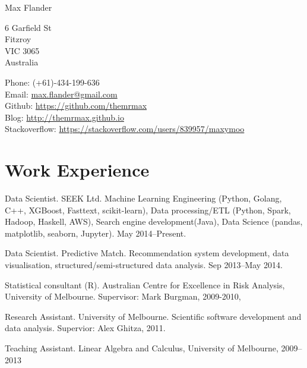 \documentclass[10pt,a4paper]{article}
\def\name{Max Flander}
\renewenvironment{itemize}{
  \begin{list}{}{
    \setlength{\leftmargin}{1.5em}
    \setlength{\itemsep}{0.25em}
    \setlength{\parskip}{0pt}
    \setlength{\parsep}{0.25em}
  }
}{
  \end{list}
}
\begin{document}
{\huge \name}


\bigskip

\begin{minipage}[t]{0.4\textwidth}
  6 Garfield St \\
  Fitzroy \\
  VIC 3065 \\
  Australia
\end{minipage}
\begin{minipage}[t]{0.5\textwidth}
  Phone: (+61)-434-199-636 \\
  Email: \href{mailto:max.flander@gmail.com}{max.flander@gmail.com} \\
  Github: \href{https://github.com/themrmax}{https://github.com/themrmax}\\
  Blog: \href{http://themrmax.github.io}{http://themrmax.github.io} \\
  Stackoverflow: \href{https://stackoverflow.com/users/839957/maxymoo}{https://stackoverflow.com/users/839957/maxymoo}
\end{minipage}
\raggedright
\section*{Work Experience}

\begin{itemize}
	\item Data Scientist. SEEK Ltd. Machine Learning Engineering (Python, Golang, C++, XGBoost, Fasttext, scikit-learn), Data processing/ETL (Python, Spark, Hadoop, Haskell, AWS), Search engine development(Java), Data Science (pandas, matplotlib, seaborn, Jupyter). May 2014--Present.
	\item Data Scientist. Predictive Match. Recommendation system development, data visualisation, structured/semi-structured data analysis. Sep 2013--May 2014.
	\item Statistical consultant (R). Australian Centre for Excellence in Risk Analysis, University of Melbourne. Supervisor: Mark Burgman, 2009-2010,
	\item Research Assistant. University of Melbourne. Scientific software development and data analysis. Supervior: Alex Ghitza, 2011.
	\item Teaching Assistant. Linear Algebra and Calculus, University of Melbourne, 2009--2013
\end{itemize}
\end{document}
